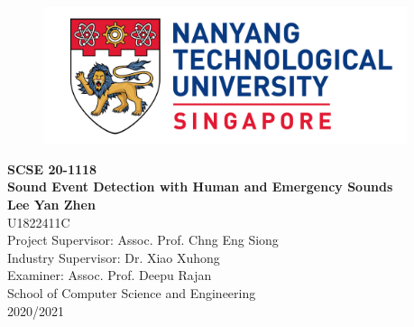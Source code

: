 \begin{titlepage}
\begin{figure}[!t]
\centering
\includegraphics[width = 4.2in]{Title/logo.png}\\[0.5in]
\caption*{}
\end{figure}

\centering
\LARGE{\textbf{SCSE 20-1118}}\\[0.1in]
\LARGE{\textbf{Sound Event Detection with Human and Emergency Sounds}}\\[1in]

\Large{\textbf{Lee Yan Zhen}}\\
\Large{U1822411C}\\[0.8in]

\Large{Project Supervisor: Assoc. Prof. Chng Eng Siong}\\
\Large{Industry Supervisor: Dr. Xiao Xuhong}\\
\Large{Examiner: Assoc. Prof. Deepu Rajan}\\[1in]

\Large{School of Computer Science and Engineering}\\[0.5in]

\Large{2020/2021}\\
\newpage
\end{titlepage}